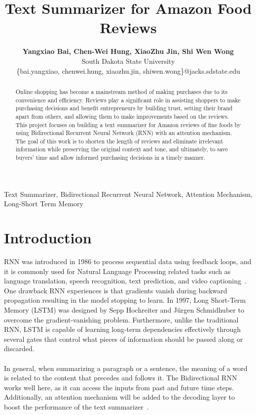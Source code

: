 \documentclass[conference]{IEEEtran}
\begin{document}
\title{\textbf{Text Summarizer for Amazon Food Reviews}\\}
\author{\textbf{\Large{Yangxiao Bai, Chen-Wei Hung, XiaoZhu Jin, Shi Wen Wong}} \\
South Dakota State University \\
\{bai.yangxiao, chenwei.hung, xiaozhu.jin, shiwen.wong\}@jacks.sdstate.edu \\
}

\maketitle

\begin{abstract}
Online shopping has become a mainstream method of making purchases due to its convenience and efficiency. Reviews play a significant role in assisting shoppers to make purchasing decisions and benefit entrepreneurs by building trust, setting their brand apart from others, and allowing them to make improvements based on the reviews. This project focuses on building a text summarizer for Amazon reviews of fine foods by using Bidirectional Recurrent Neural Network (RNN) with an attention mechanism. The goal of this work is to shorten the length of reviews and eliminate irrelevant information while preserving the original context and tone, and ultimately, to save buyers’ time and allow informed purchasing decisions in a timely manner. 
\end{abstract} 

\begin{IEEEkeywords}
Text Summarizer, Bidirectional Recurrent Neural Network, Attention Mechanism, Long-Short Term Memory
\end{IEEEkeywords}

\section{Introduction}
RNN was introduced in 1986 to process sequential data using feedback loops, and it is commonly used for Natural Language Processing related tasks such as language translation, speech recognition, text prediction, and video captioning~\cite{staudemeyer2019understanding}. One drawback RNN experiences is that gradients vanish during backward propagation resulting in the model stopping to learn. In 1997, Long Short-Term Memory (LSTM) was designed by Sepp Hochreiter and J\"{u}rgen Schmidhuber to overcome the gradient-vanishing problem. Furthermore, unlike the traditional RNN, LSTM is capable of learning long-term dependencies effectively through several gates that control what pieces of information should be passed along or discarded. \\ \\
\indent In general, when summarizing a paragraph or a sentence, the meaning of a word is related to the content that precedes and follows it. The Bidirectional RNN works well here, as it can access the inputs from past and future time steps. Additionally, an attention mechanism will be added to the decoding layer to boost the performance of the text summarizer~\cite{vaswani2017attention}. 
\end{document}

